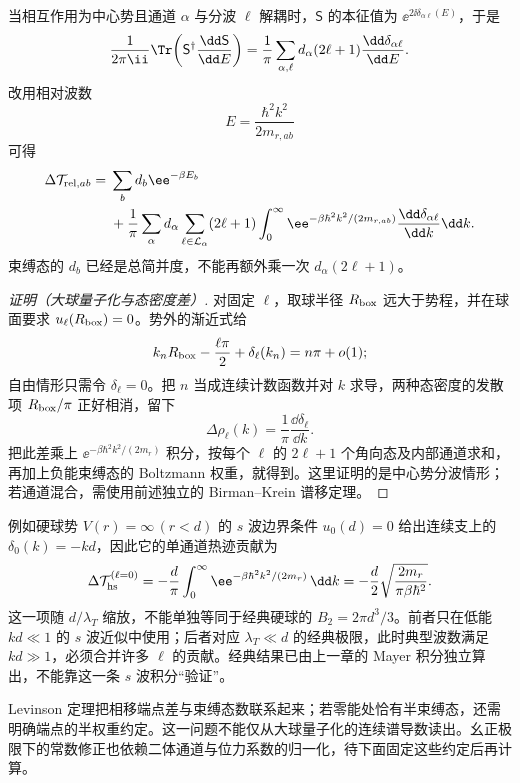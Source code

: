 当相互作用为中心势且通道 \(\alpha\) 与分波 \(\ell\) 解耦时，\(\mathsf S\) 的本征值为 \(\ee^{2\ii\delta_{\alpha\ell}(E)}\)，于是
\[
 \frac{1}{2\pi\ii}
 \Tr\!\left(\mathsf S^\dagger\frac{\dd\mathsf S}{\dd E}\right)
 =\frac1\pi\sum_{\alpha,\ell}
 d_\alpha(2\ell+1)
 \frac{\dd\delta_{\alpha\ell}}{\dd E}.
\]
改用相对波数
\[
 E=\frac{\hbar^2k^2}{2m_{r,ab}}
\]
可得
\begin{equation}
 \begin{aligned}
 \Delta\mathcal T_{{\rm rel},ab}
 ={}&\sum_b d_b\ee^{-\beta E_b}\\
 &+\frac1\pi\sum_\alpha d_\alpha
 \sum_{\ell\in\mathcal L_\alpha}(2\ell+1)
 \int_0^\infty
 \ee^{-\beta\hbar^2k^2/(2m_{r,ab})}
 \frac{\dd\delta_{\alpha\ell}}{\dd k}\dd k.
 \end{aligned}
 \label{eq:phys-sm-bu-general}
\end{equation}
束缚态的 \(d_b\) 已经是总简并度，不能再额外乘一次 \(d_\alpha(2\ell+1)\)。

\begin{proof}[证明（大球量子化与态密度差）]
对固定 \(\ell\)，取球半径 \(R_{\rm box}\) 远大于势程，并在球面要求 \(u_\ell(R_{\rm box})=0\)。势外的渐近式给
\[
k_nR_{\rm box}-\frac{\ell\pi}{2}
+\delta_\ell(k_n)=n\pi+o(1);
\]
自由情形只需令 \(\delta_\ell=0\)。把 \(n\) 当成连续计数函数并对 \(k\) 求导，两种态密度的发散项 \(R_{\rm box}/\pi\) 正好相消，留下
\begin{equation}
\Delta\rho_\ell(k)
=\frac1\pi\frac{\dd\delta_\ell}{\dd k}.
\label{eq:phys-sm-phase-density-shift}
\end{equation}
把此差乘上 \(\ee^{-\beta\hbar^2k^2/(2m_r)}\) 积分，按每个 \(\ell\) 的 \(2\ell+1\) 个角向态及内部通道求和，再加上负能束缚态的 Boltzmann 权重，就得到。这里证明的是中心势分波情形；若通道混合，需使用前述独立的 Birman--Krein 谱移定理。
\end{proof}

例如硬球势 \(V(r)=\infty\,(r<d)\) 的 \(s\) 波边界条件 \(u_0(d)=0\) 给出连续支上的 \(\delta_0(k)=-kd\)，因此它的单通道热迹贡献为
\[
\Delta\mathcal T_{\rm hs}^{(\ell=0)}
=-\frac{d}{\pi}\int_0^\infty
\ee^{-\beta\hbar^2k^2/(2m_r)}\,\dd k
=-\frac d2\sqrt{\frac{2m_r}{\pi\beta\hbar^2}}.
\]
这一项随 \(d/\lambda_T\) 缩放，不能单独等同于经典硬球的 \(B_2=2\pi d^3/3\)。前者只在低能 \(kd\ll1\) 的 \(s\) 波近似中使用；后者对应 \(\lambda_T\ll d\) 的经典极限，此时典型波数满足 \(kd\gg1\)，必须合并许多 \(\ell\) 的贡献。经典结果已由上一章的 Mayer 积分独立算出，不能靠这一条 \(s\) 波积分“验证”。

Levinson 定理把相移端点差与束缚态数联系起来；若零能处恰有半束缚态，还需明确端点的半权重约定。这一问题不能仅从大球量子化的连续谱导数读出。幺正极限下的常数修正也依赖二体通道与位力系数的归一化，待下面固定这些约定后再计算。

